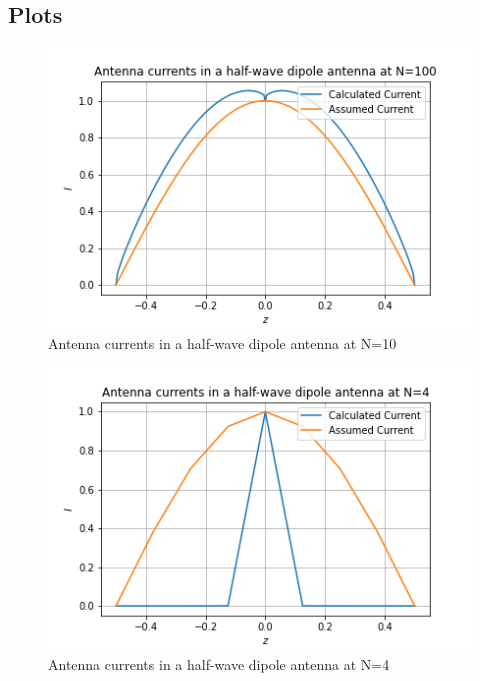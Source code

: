 \documentclass[11pt, a4paper]{article}
\begin{document}
\subsection{Plots}
\begin{figure}[!tbh]
   	\centering
   	\includegraphics[scale=0.6]{fig1.png}  %
   	\caption{Antenna currents in a half-wave dipole antenna at N=10}
   	\label{fig:sample}
   \end{figure}
   
   \begin{figure}[!tbh]
   	\centering
   	\includegraphics[scale=0.6]{fig2.png}  %
   	\caption{Antenna currents in a half-wave dipole antenna at N=4}
   	\label{fig:sample}
   \end{figure}
\end{document}
